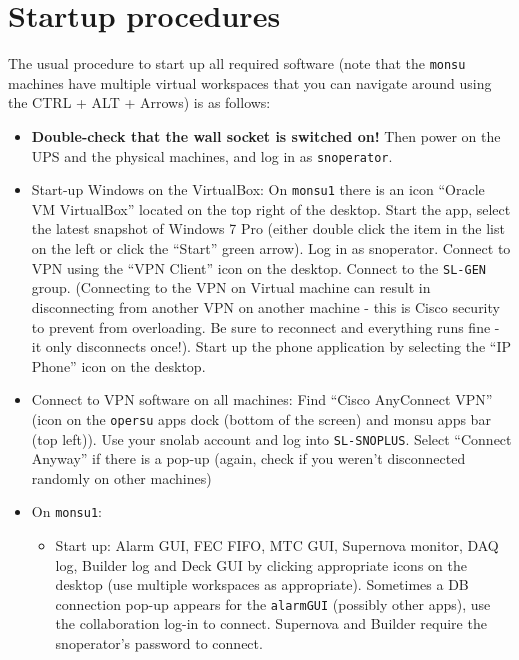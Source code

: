 \documentclass[12pt, a4paper]{article}
\begin{document}
\section{Startup procedures}
The usual procedure to start up all required software (note that the {\tt monsu} machines have multiple virtual workspaces that you can navigate around using the CTRL + ALT + Arrows) is as follows:
\begin{itemize}
	\item {\bf Double-check that the wall socket is switched on!} Then power on the UPS and the physical machines, and log in as {\tt snoperator}. 
	\item Start-up Windows on the VirtualBox: On {\tt monsu1} there is an icon ``Oracle VM VirtualBox'' located on the top right of the desktop. Start the app, select the latest snapshot of Windows 7 Pro (either double click the item in the list on the left or click the ``Start'' green arrow). Log in as snoperator. Connect to VPN using the ``VPN Client'' icon on the desktop. Connect to the {\tt SL-GEN} group. (Connecting to the VPN on Virtual machine can result in disconnecting from another VPN on another machine - this is Cisco security to prevent from overloading. Be sure to reconnect and everything runs fine - it only disconnects once!). Start up the phone application by selecting the ``IP Phone'' icon on the desktop. %
	\item Connect to VPN software on all machines: Find ``Cisco AnyConnect VPN'' (icon on the {\tt opersu} apps dock (bottom of the screen) and monsu apps bar (top left)). Use your snolab account and log into {\tt SL-SNOPLUS}. Select ``Connect Anyway'' if there is a pop-up (again, check if you weren't disconnected randomly on other machines)
	\item On {\tt monsu1}:
	\begin{itemize}
		\item Start up: Alarm GUI, FEC FIFO, MTC GUI, Supernova monitor, DAQ log, Builder log and Deck GUI by clicking appropriate icons on the desktop (use multiple workspaces as appropriate). Sometimes a DB connection pop-up appears for the {\tt alarmGUI} (possibly other apps), use the collaboration log-in to connect. Supernova and Builder require the snoperator's password to connect.		

\end{itemize}
\end{itemize}
\end{document}
